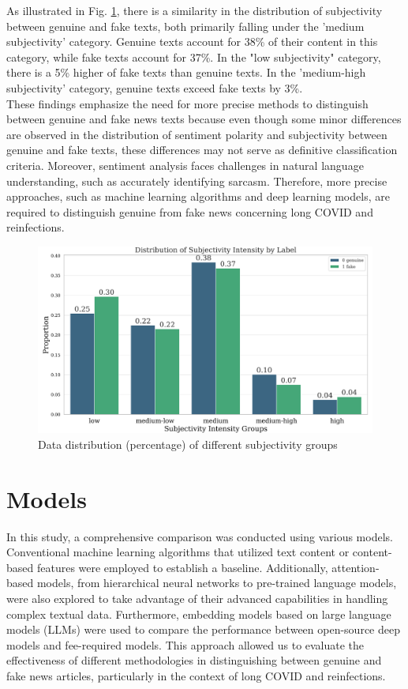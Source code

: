 As illustrated in Fig. \ref {fig:subjectivity}, there is a similarity in the distribution of subjectivity between genuine and fake texts, both primarily falling under the 'medium subjectivity' category. Genuine texts account for 38\% of their content in this category, while fake texts account for 37\%. In the "low subjectivity" category, there is a 5\% higher of fake texts than genuine texts. In the 'medium-high subjectivity' category, genuine texts exceed fake texts by 3\%. \\

These findings emphasize the need for more precise methods to distinguish between genuine and fake news texts because even though some minor differences are observed in the distribution of sentiment polarity and subjectivity between genuine and fake texts, these differences may not serve as definitive classification criteria. Moreover, sentiment analysis faces challenges in natural language understanding, such as accurately identifying sarcasm. Therefore, more precise approaches, such as machine learning algorithms and deep learning models, are required to distinguish genuine from fake news concerning long COVID and reinfections.

\begin{figure}
    \centering
    \includegraphics[width=1\linewidth]{img/Subjectivity.png}
    \caption{Data distribution (percentage) of different subjectivity groups}
    \label{fig:subjectivity}
\end{figure}

\section{Models}
In this study, a comprehensive comparison was conducted using various models. Conventional machine learning algorithms that utilized text content or content-based features were employed to establish a baseline. Additionally, attention-based models, from hierarchical neural networks to pre-trained language models, were also explored to take advantage of their advanced capabilities in handling complex textual data. Furthermore, embedding models based on large language models (LLMs) were used to compare the performance between open-source deep models and fee-required models. This approach allowed us to evaluate the effectiveness of different methodologies in distinguishing between genuine and fake news articles, particularly in the context of long COVID and reinfections.

